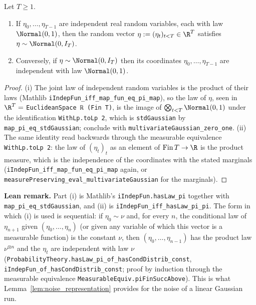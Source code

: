\begin{lemma}\label{lem:gauss_pi}
\leanok
{}
Let $T \ge 1$.
\begin{enumerate}
  \item[(i)] If $\eta_0, \dots, \eta_{T-1}$ are independent real random variables, each with
        law $\Normal(0,1)$, then the random vector $\eta := (\eta_t)_{t<T} \in \R^T$
        satisfies $\eta \sim \Normal(0, I_T)$.
  \item[(ii)] Conversely, if $\eta \sim \Normal(0, I_T)$ then its coordinates
        $\eta_0,\dots,\eta_{T-1}$ are independent with law $\Normal(0,1)$.
\end{enumerate}
\end{lemma}

\begin{proof}
(i) The joint law of independent random variables is the product of their laws
(Mathlib \texttt{iIndepFun\_iff\_map\_fun\_eq\_pi\_map}), so the law of $\eta$, seen in
$\R^T = $ \texttt{EuclideanSpace ℝ (Fin T)}, is the image of
$\bigotimes_{t<T}\Normal(0,1)$ under the identification \texttt{WithLp.toLp 2}, which is
\texttt{stdGaussian} by \texttt{map\_pi\_eq\_stdGaussian}; conclude with
\texttt{multivariateGaussian\_zero\_one}. (ii) The same identity read backwards through the
measurable equivalence \texttt{WithLp.toLp 2}: the law of $(\eta_t)_t$ as an element of
$\mathrm{Fin}\,T \to \R$ is the product measure, which is the independence of the
coordinates with the stated marginals (\texttt{iIndepFun\_iff\_map\_fun\_eq\_pi\_map} again,
or \texttt{measurePreserving\_eval\_multivariateGaussian} for the marginals).
\end{proof}

\textbf{Lean remark.} Part (i) is Mathlib's \texttt{iIndepFun.hasLaw\_pi} together with
\texttt{map\_pi\_eq\_stdGaussian}, and (ii) is \texttt{iIndepFun\_iff\_hasLaw\_pi\_pi}. The form
in which (i) is used is sequential: if $\eta_0 \sim \nu$ and, for every $n$, the conditional law
of $\eta_{n+1}$ given $(\eta_0,\dots,\eta_n)$ (or given any variable of which this vector is a
measurable function) is the constant $\nu$, then $(\eta_0,\dots,\eta_{n-1})$ has the product law
$\nu^{\otimes n}$ and the $\eta_t$ are independent with law $\nu$
(\texttt{ProbabilityTheory.hasLaw\_pi\_of\_hasCondDistrib\_const},
\texttt{iIndepFun\_of\_hasCondDistrib\_const}; proof by induction through the measurable
equivalence \texttt{MeasurableEquiv.piFinSuccAbove}). This is what
Lemma~\ref{lem:noise_representation} provides for the noise of a linear Gaussian run.

